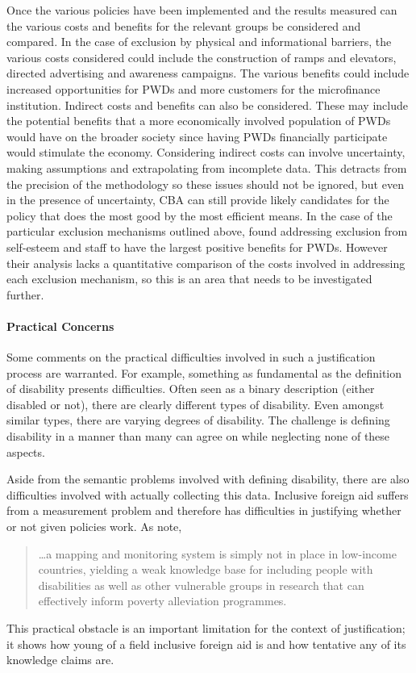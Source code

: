 \documentclass[a4paper]{article}
\begin{document}
Once the various policies have been implemented and the results measured can
the various costs and benefits for the relevant groups be considered and
compared. In the case of exclusion by physical and informational barriers, the
various costs considered could include the construction of ramps and
elevators, directed advertising and awareness campaigns. The various benefits
could include increased opportunities for PWDs and more customers for the
microfinance institution. Indirect costs and benefits can also be considered.
These may include the potential benefits that a more economically involved
population of PWDs would have on the broader society since having PWDs
financially participate would stimulate the economy. Considering indirect
costs can involve uncertainty, making assumptions and extrapolating from
incomplete data. This detracts from the precision of the methodology so these
issues should not be ignored, but even in the presence of uncertainty, CBA can
still provide likely candidates for the policy that does the most good by the
most efficient means. In the case of the particular exclusion mechanisms
outlined above, \cite{mersland2008access} found addressing exclusion from
self-esteem and staff to have the largest positive benefits for PWDs. However
their analysis lacks a quantitative comparison of the costs involved in
addressing each exclusion mechanism, so this is an area that needs to be
investigated further.

\paragraph{Practical Concerns}

Some comments on the practical difficulties involved in such a justification
process are warranted. For example, something as fundamental as the definition
of disability presents difficulties. Often seen as a binary description
(either disabled or not), there are clearly different types of disability.
Even amongst similar types, there are varying degrees of disability. The
challenge is defining disability in a manner than many can agree on while
neglecting none of these aspects.

Aside from the semantic problems involved with defining disability, there are
also difficulties involved with actually collecting this data. Inclusive
foreign aid suffers from a measurement problem and therefore has difficulties
in justifying whether or not given policies work. As
\cite{ingstad2011disability} note,
%
\begin{quote}
    \ldots a mapping and monitoring system is simply not in place in
    low-income countries, yielding a weak knowledge base for including people
    with disabilities as well as other vulnerable groups in research that can
    effectively inform poverty alleviation programmes.
\end{quote}
%
This practical obstacle is an important limitation for the context of
justification; it shows how young of a field inclusive foreign aid is and how
tentative any of its knowledge claims are.
\end{document}
